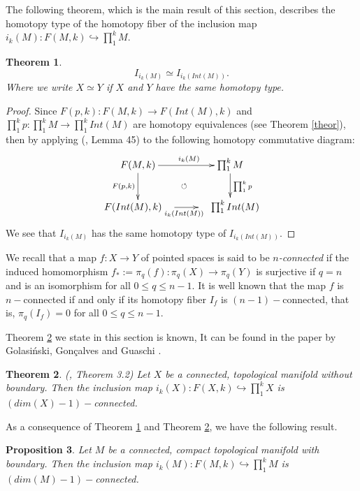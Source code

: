 \documentclass{amsart}
\newtheorem{thm}{Theorem}[section]
\newtheorem{prop}[thm]{Proposition}
\theoremstyle{definition}
\numberwithin{equation}{section}
\begin{document}
The following theorem, which is the main result of this section, describes the homotopy type of the homotopy fiber of the inclusion  map $i_k(M):F(M,k)\hookrightarrow \prod_{1}^{k}M$.

\begin{thm}\label{homotopy-fiber}
\begin{equation}
I_{i_k(M)}\simeq I_{i_k(Int(M))}.
\end{equation} Where we write $X\simeq Y$ if $X$ and $Y$ have the same homotopy type.
\end{thm}
\begin{proof}
Since $F(p,k):F(M,k)\longrightarrow F(Int(M),k)$ and $\prod_{1}^{k}p:\prod_{1}^{k}M\longrightarrow \prod_{1}^{k}Int(M)$ are homotopy equivalences (see Theorem \ref{theor}), then by applying (\cite{mather1976pull}, Lemma 45) to the following homotopy commutative diagram:
\begin{equation}
\xymatrix{ F(M,k) \ar[d]_{F(p,k)} \ar[r]^{\quad i_k(M)} \ar@{}[dr]|{\circlearrowleft} & 
\prod_{1}^{k}M \ar[d]^{\prod_{1}^{k}p} \\ F(Int(M),k)\quad \ar[r]_{\quad i_k(Int(M))\quad} &\quad \prod_{1}^{k}Int(M)
}
\end{equation}
We see that $I_{i_k(M)}$ has the same homotopy type of  $I_{i_k(Int(M))}$.
\end{proof}

We recall that a map $f:X\longrightarrow Y$ of pointed spaces is said to be \textit{$n$-connected} if the induced homomorphism $f_\ast:=\pi_q(f):\pi_q(X)\longrightarrow \pi_q(Y)$ is surjective if $q=n$ and is an isomorphism for all $0\leq q\leq n-1$. It is well known that the map $f$ is $n-$connected if and only if its homotopy fiber $I_f$ is $(n-1)-$connected, that is, $\pi_q(I_f)=0$ for all $0\leq q\leq n-1$.

Theorem \ref{marek} we state in this section is known, It can be found in the paper by Golasi{\'n}ski,  Gon{\c{c}}alves and Guaschi \cite{golasinski2017homotopy}. 

\begin{thm}\label{marek}(\cite{golasinski2017homotopy}, Theorem 3.2)
Let $X$ be a connected, topological manifold without boundary. Then the inclusion map $i_k(X):F(X,k)\hookrightarrow \prod_{1}^{k} X$ is $(dim(X)-1)-$connected.
\end{thm}

As a consequence of Theorem \ref{homotopy-fiber} and Theorem \ref{marek}, we have the following result.

\begin{prop}\label{dim-con} Let $M$ be a connected, compact topological manifold with boundary. Then the inclusion map $i_k(M):F(M,k)\hookrightarrow \prod_{1}^{k} M$ is $(dim(M)-1)-$connected.
\end{prop}
\end{document}
